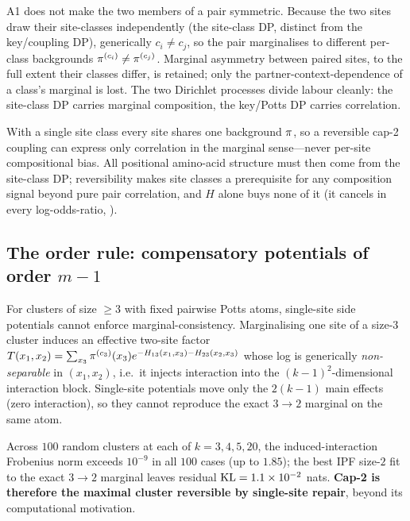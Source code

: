 \begin{remark}
\label{rem:a1-keeps}
A1 does not make the two members of a pair symmetric. Because the
two sites draw their site-classes independently (the site-class DP,
distinct from the key/coupling DP), generically $c_i\neq c_j$, so
the pair marginalises to different per-class backgrounds
$\pi^{(c_i)}\neq\pi^{(c_j)}$. Marginal asymmetry between paired
sites, to the full extent their classes differ, is retained; only
the partner-context-dependence of a class's marginal is lost. The
two Dirichlet processes divide labour cleanly: the site-class DP
carries marginal composition, the key/Potts DP carries correlation.
\end{remark}

\begin{remark}
\label{rem:classes-required}
With a single site class every site shares one background $\pi$,
so a reversible cap-2 coupling can express only correlation in the
marginal sense---never per-site compositional bias. All positional
amino-acid structure must then come from the site-class DP;
reversibility makes site classes a prerequisite for any composition
signal beyond pure pair correlation, and $H$ alone buys none of it
(it cancels in every log-odds-ratio, ).
\end{remark}

\subsection{The order rule: compensatory potentials of order $m{-}1$}
\label{sec:order-rule-suppl}

\begin{proposition}
\label{prop:capk}
For clusters of size $\ge 3$ with fixed pairwise Potts atoms,
single-site side potentials cannot enforce marginal-consistency.
Marginalising one site of a size-$3$ cluster induces an effective
two-site factor
$T(x_1,x_2)=\sum_{x_3}\pi^{(c_3)}(x_3)
 e^{-H_{13}(x_1,x_3)-H_{23}(x_2,x_3)}$ whose log is generically
\emph{non-separable} in $(x_1,x_2)$, i.e.\ it injects interaction
into the $(k-1)^2$-dimensional interaction block. Single-site
potentials move only the $2(k-1)$ main effects (zero interaction),
so they cannot reproduce the exact $3\!\to\!2$ marginal on the same
atom.
\end{proposition}

Across $100$ random clusters at each of $k=3,4,5,20$, the
induced-interaction Frobenius norm exceeds $10^{-9}$ in all $100$
cases (up to $1.85$); the best IPF size-$2$ fit to the exact
$3\!\to\!2$ marginal leaves residual $\mathrm{KL}=1.1\times 10^{-2}$ nats.
\textbf{Cap-2 is therefore the maximal cluster reversible by
single-site repair}, beyond its computational motivation.

